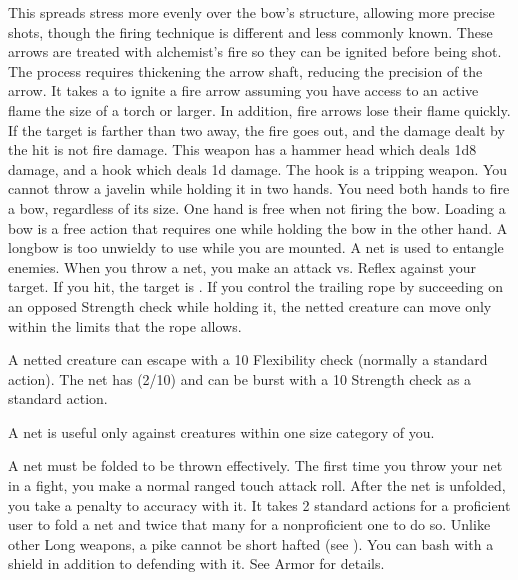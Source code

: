         This spreads stress more evenly over the bow's structure, allowing more precise shots, though the firing technique is different and less commonly known.
         These arrows are treated with alchemist's fire so they can be ignited before being shot.
        The process requires thickening the arrow shaft, reducing the precision of the arrow.
        It takes a  to ignite a fire arrow assuming you have access to an active flame the size of a torch or larger.
        In addition, fire arrows lose their flame quickly.
        If the target is farther than two  away, the fire goes out, and the damage dealt by the hit is not fire damage.
         This weapon has a hammer head which deals 1d8 damage, and a hook which deals \minus1d damage. The hook is a tripping weapon.
         You cannot throw a javelin while holding it in two hands.
         You need both hands to fire a bow, regardless of its size. One hand is free when not firing the bow. Loading a bow is a free action that requires one  while holding the bow in the other hand. A longbow is too unwieldy to use while you are mounted.
         A net is used to entangle enemies. When you throw a net, you make an attack vs. Reflex against your target. If you hit, the target is \slowed. If you control the trailing rope by succeeding on an opposed Strength check while holding it, the netted creature can move only within the limits that the rope allows.
        \par A netted creature can escape with a  10 Flexibility check (normally a standard action). The net has (2/10) and can be burst with a  10 Strength check as a standard action.
        \par A net is useful only against creatures within one size category of you.
        \par A net must be folded to be thrown effectively. The first time you throw your net in a fight, you make a normal ranged touch attack roll. After the net is unfolded, you take a  penalty to accuracy with it. It takes 2 standard actions for a proficient user to fold a net and twice that many for a nonproficient one to do so.
         Unlike other Long weapons, a pike cannot be short hafted (see ).
         You can bash with a shield in addition to defending with it. See Armor for details.
